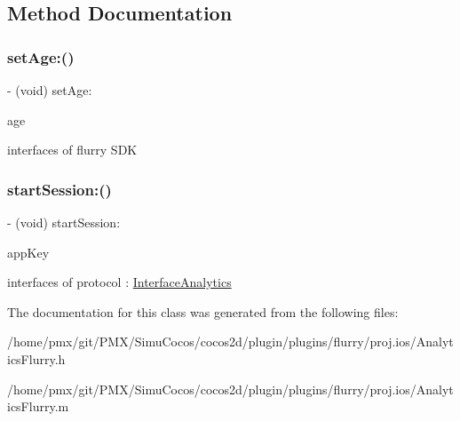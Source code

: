 \subsection{Method Documentation}
\mbox{\label{interfaceAnalyticsFlurry_aeb72cbaba6537c4e6a886fef638dbc03}} 
\subsubsection{\texorpdfstring{set\+Age\+:()}{setAge:()}}
{\footnotesize\ttfamily -\/ (void) set\+Age\+: \begin{DoxyParamCaption}\item[{(N\+S\+Number$\ast$)}]{age }\end{DoxyParamCaption}}

interfaces of flurry S\+DK \mbox{\label{interfaceAnalyticsFlurry_ab1e93c788f45405bea5ed780bd4601ab}} 
\subsubsection{\texorpdfstring{start\+Session\+:()}{startSession:()}}
{\footnotesize\ttfamily -\/ (void) start\+Session\+: \begin{DoxyParamCaption}\item[{(N\+S\+String$\ast$)}]{app\+Key }\end{DoxyParamCaption}}

interfaces of protocol \+: \hyperlink{classInterfaceAnalytics-p}{Interface\+Analytics} 

The documentation for this class was generated from the following files\+:\begin{DoxyCompactItemize}
\item 
/home/pmx/git/\+P\+M\+X/\+Simu\+Cocos/cocos2d/plugin/plugins/flurry/proj.\+ios/Analytics\+Flurry.\+h\item 
/home/pmx/git/\+P\+M\+X/\+Simu\+Cocos/cocos2d/plugin/plugins/flurry/proj.\+ios/Analytics\+Flurry.\+m\end{DoxyCompactItemize}
